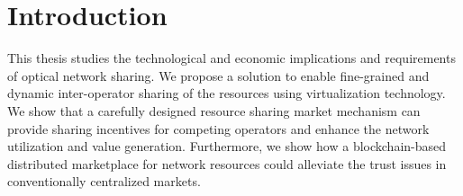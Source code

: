 \chapter*{Introduction}%
This thesis studies the technological and economic implications and requirements of optical network sharing. We propose a solution to enable fine-grained and dynamic inter-operator sharing of the resources using virtualization technology. We show that a carefully designed resource sharing market mechanism can provide sharing incentives for competing operators and enhance the network utilization and value generation. Furthermore, we show how a blockchain-based distributed marketplace for network resources could alleviate the trust issues in conventionally centralized markets. 








